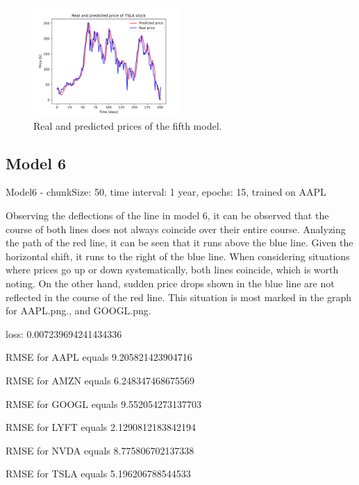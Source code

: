 \begin{figure}
\includegraphics[width=0.5\textwidth]{./graf/model5/TSLA.png}
\caption{Real and predicted prices of the fifth model.}
\label{fig:label}
\end{figure} 

\clearpage
\subsection{Model 6}

Model6 - chunkSize: 50, time interval: 1 year, epochs: 15, trained on AAPL\par\bigskip
Observing the deflections of the line in model 6, it can be observed that the course of both lines does
not always coincide over their entire course. Analyzing the path of the red line, it can be seen that it
runs above the blue line. Given the horizontal shift, it runs to the right of the blue line. When
considering situations where prices go up or down systematically, both lines coincide, which is worth
noting. On the other hand, sudden price drops shown in the blue line are not reflected in the course
of the red line. This situation is most marked in the graph for AAPL.png., and GOOGL.png.
\par\bigskip
loss: 0.007239694241434336\par
RMSE for AAPL equals 9.205821423904716\par
RMSE for AMZN equals 6.248347468675569\par
RMSE for GOOGL equals 9.552054273137703\par
RMSE for LYFT equals 2.1290812183842194\par
RMSE for NVDA equals 8.775806702137338\par
RMSE for TSLA equals 5.196206788544533\par

